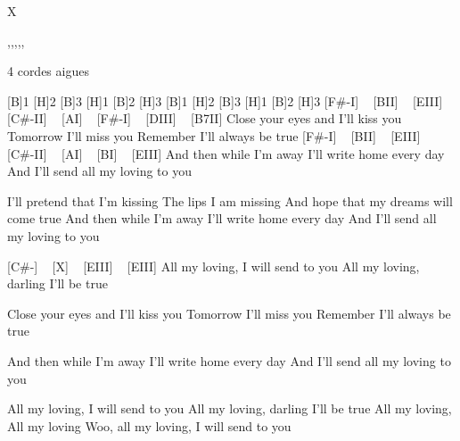 X
\begin{tabline}{1}{}{}{,,,,,}
\end{tabline}

\begin{guitar}
4 cordes aigues

[B]1 [H]2 [B]3 [H]1 [B]2 [H]3 [B]1 [H]2 [B]3 [H]1 [B]2 [H]3 
[F#-I] ~ [BII] ~ [EIII] ~ [C#-II] ~ [AI] ~ [F#-I] ~ [DIII] ~ [B7II]
Close your eyes and I'll kiss you
Tomorrow I'll miss you
Remember I'll always be true
[F#-I] ~ [BII] ~ [EIII] ~ [C#-II] ~ [AI] ~ [BI] ~ [EIII]
And then while I'm away
I'll write home every day
And I'll send all my loving to you

I'll pretend that I'm kissing
The lips I am missing
And hope that my dreams will come true
And then while I'm away
I'll write home every day
And I'll send all my loving to you

[C#-] ~ [X] ~ [EIII] ~ [EIII]
All my loving, I will send to you
All my loving, darling I'll be true

Close your eyes and I'll kiss you
Tomorrow I'll miss you
Remember I'll always be true

And then while I'm away
I'll write home every day
And I'll send all my loving to you

All my loving, I will send to you
All my loving, darling I'll be true
All my loving, All my loving
Woo, all my loving, I will send to you
\end{guitar}
